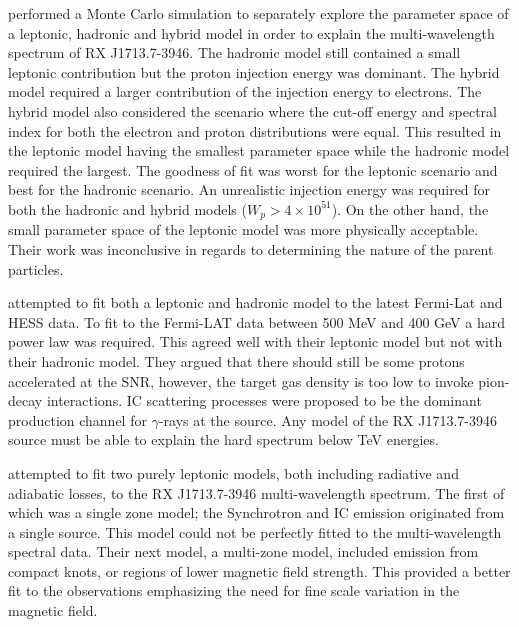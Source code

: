 \documentclass[12pt,a4paper]{article}
\begin{document}
\cite{2011ApJ...735..120Y} performed a Monte Carlo simulation to separately explore the parameter space of a leptonic, hadronic and hybrid model in order to explain the multi-wavelength spectrum of RX J1713.7-3946. The hadronic model still contained a small leptonic contribution but the proton injection energy was dominant. The hybrid model required a larger contribution of the injection energy to electrons. The hybrid model also considered the scenario where the cut-off energy and spectral index for both the electron and proton distributions were equal. This resulted in the leptonic model having the smallest parameter space while the hadronic model required the largest. The goodness of fit was worst for the leptonic scenario and best for the hadronic scenario. An unrealistic injection energy was required for both the hadronic and hybrid models ($W_p > 4 \times 10^{51}$). On the other hand, the small parameter space of the leptonic model was more physically acceptable. Their work was inconclusive in regards to determining the nature of the parent particles.

\cite{2011ApJ...734...28A} attempted to fit both a leptonic and hadronic model to the latest Fermi-Lat and HESS data. To fit to the Fermi-LAT data between 500 MeV and 400 GeV a hard power law was required. This agreed well with their leptonic model but not with their hadronic model. They argued that there should still be some protons accelerated at the SNR, however, the target gas density is too low to invoke pion-decay interactions. IC scattering processes were proposed to be the dominant production channel for $\gamma$-rays at the source. Any model of the RX J1713.7-3946 source must be able to explain the hard spectrum below TeV energies.

\cite{2012ApJ...751...65F} attempted to fit two purely leptonic models, both including radiative and adiabatic losses, to the RX J1713.7-3946 multi-wavelength spectrum. The first of which was a single zone model; the Synchrotron and IC emission originated from a single source. This model could not be perfectly fitted to the multi-wavelength spectral data. Their next model, a multi-zone model, included emission from compact knots, or regions of lower magnetic field strength. This provided a better fit to the observations emphasizing the need for fine scale variation in the magnetic field. 
\end{document}
